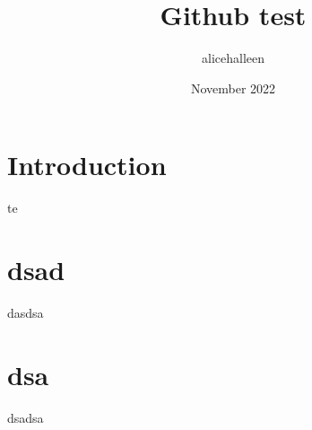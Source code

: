 \documentclass{article}
\title{Github test}
\author{alicehalleen }
\date{November 2022}
\begin{document}
\maketitle

\section{Introduction}
te
\section{dsad}
dasdsa
\section{dsa}
dsadsa
\end{document}
